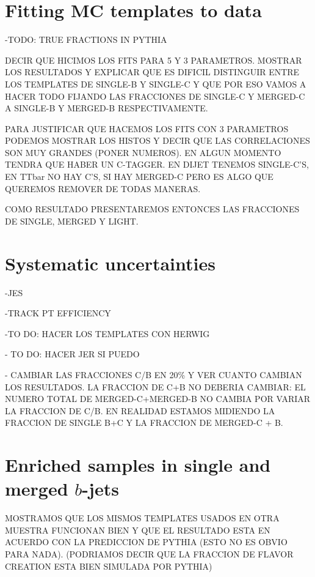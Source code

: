 \section{Fitting MC templates to data}\label{sec:FitsResults}

-TODO: TRUE FRACTIONS IN PYTHIA

DECIR QUE HICIMOS LOS FITS PARA 5 Y 3 PARAMETROS. MOSTRAR LOS RESULTADOS Y EXPLICAR QUE ES DIFICIL DISTINGUIR ENTRE LOS TEMPLATES DE SINGLE-B Y SINGLE-C Y QUE POR ESO VAMOS A HACER TODO FIJANDO LAS FRACCIONES DE SINGLE-C Y MERGED-C A SINGLE-B Y MERGED-B RESPECTIVAMENTE.

PARA JUSTIFICAR QUE HACEMOS LOS FITS CON 3 PARAMETROS PODEMOS MOSTRAR LOS HISTOS Y DECIR QUE LAS CORRELACIONES SON MUY GRANDES (PONER NUMEROS). EN ALGUN MOMENTO TENDRA QUE HABER UN C-TAGGER.  EN DIJET TENEMOS SINGLE-C'S, EN TTbar NO HAY C'S, SI HAY MERGED-C PERO ES ALGO QUE QUEREMOS REMOVER DE TODAS MANERAS.



COMO RESULTADO PRESENTAREMOS ENTONCES LAS FRACCIONES DE SINGLE, MERGED Y LIGHT.


\section{Systematic uncertainties}\label{sec:FractionSystematics}

-JES

-TRACK PT EFFICIENCY

-TO DO: HACER LOS TEMPLATES CON HERWIG

- TO DO: HACER JER SI PUEDO

- CAMBIAR LAS FRACCIONES C/B EN 20\% Y VER CUANTO CAMBIAN LOS RESULTADOS. LA FRACCION DE C+B NO DEBERIA CAMBIAR:  EL NUMERO TOTAL DE MERGED-C+MERGED-B NO CAMBIA POR VARIAR LA FRACCION DE C/B. EN REALIDAD ESTAMOS MIDIENDO LA FRACCION DE SINGLE B+C Y LA FRACCION DE MERGED-C + B.

\section{Enriched samples in single and merged $b$-jets}\label{sec:Enriched}

MOSTRAMOS QUE LOS MISMOS TEMPLATES USADOS EN OTRA MUESTRA FUNCIONAN BIEN Y QUE EL RESULTADO ESTA EN ACUERDO CON LA PREDICCION DE PYTHIA (ESTO NO ES OBVIO PARA NADA).
(PODRIAMOS DECIR QUE LA FRACCION DE FLAVOR CREATION ESTA BIEN SIMULADA POR PYTHIA)
